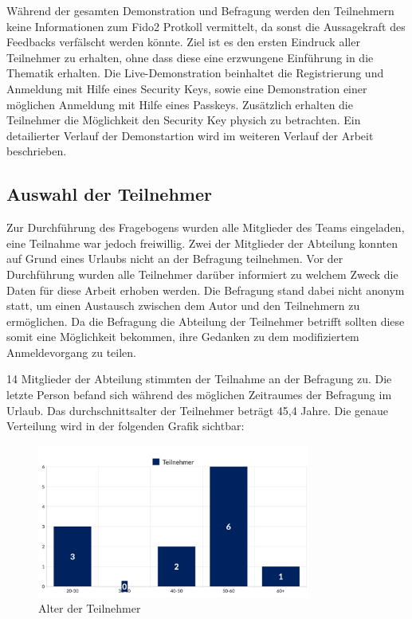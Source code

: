 Während der gesamten Demonstration und Befragung werden den Teilnehmern keine Informationen zum Fido2 Protkoll vermittelt, da sonst die Aussagekraft des Feedbacks verfälscht werden könnte. Ziel ist es den ersten Eindruck aller Teilnehmer zu erhalten, ohne dass diese eine erzwungene Einführung in die Thematik erhalten. Die Live-Demonstration beinhaltet die Registrierung und Anmeldung mit Hilfe eines Security Keys, sowie eine Demonstration einer möglichen Anmeldung mit Hilfe eines Passkeys. Zusätzlich erhalten die Teilnehmer die Möglichkeit den Security Key physich zu betrachten. Ein detailierter Verlauf der Demonstartion wird im weiteren Verlauf der Arbeit beschrieben.

\subsection{Auswahl der Teilnehmer}
Zur Durchführung des Fragebogens wurden alle Mitglieder des Teams eingeladen, eine Teilnahme war jedoch freiwillig. Zwei der Mitglieder der Abteilung konnten auf Grund eines Urlaubs nicht an der Befragung teilnehmen. Vor der Durchführung wurden alle Teilnehmer darüber informiert zu welchem Zweck die Daten für diese Arbeit erhoben werden. Die Befragung stand dabei nicht anonym statt, um einen Austausch zwischen dem Autor und den Teilnehmern zu ermöglichen. Da die Befragung die Abteilung der Teilnehmer betrifft sollten diese somit eine Möglichkeit bekommen, ihre Gedanken zu dem modifiziertem Anmeldevorgang zu teilen.

14 Mitglieder der Abteilung stimmten der Teilnahme an der Befragung zu. Die letzte Person befand sich während des möglichen Zeitraumes der Befragung im Urlaub. Das durchschnittsalter der Teilnehmer beträgt 45,4 Jahre. Die genaue Verteilung wird in der folgenden Grafik sichtbar:

\begin{figure}[h]
	\centering 
	\includegraphics[width=0.8\textwidth]{img/abbildungen/chart-2.png}
	\captionsetup{format=hang}
	\caption{Alter der Teilnehmer}
\end{figure}

